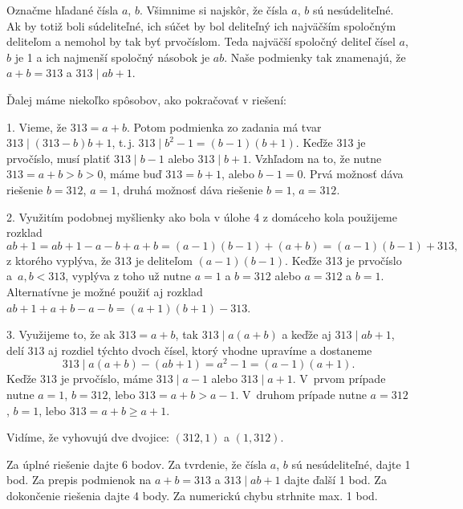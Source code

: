 {%
Označme hľadané čísla $a$, $b$.
Všimnime si najskôr, že čísla $a$, $b$ sú nesúdeliteľné.
Ak by totiž boli súdeliteľné, ich súčet by bol deliteľný ich najväčším spoločným deliteľom a nemohol by tak byť prvočíslom.
Teda najväčší spoločný deliteľ čísel $a$, $b$ je 1 a ich najmenší spoločný násobok je $ab$. Naše podmienky tak znamenajú, že $a+b=313$ a $313\mid ab+1$.

Ďalej máme niekoľko spôsobov, ako pokračovať v riešení:

\smallskip
\item{1.} Vieme, že $313=a+b$.
Potom podmienka zo zadania má tvar $313\mid (313-b)b+1$, t.\,j. $313\mid b^2-1=(b-1)(b+1)$.
Keďže 313 je prvočíslo, musí platiť $313\mid b-1$ alebo $313\mid b+1$.
Vzhľadom na to, že nutne $313=a+b>b>0$, máme buď $313=b+1$, alebo $b-1=0$. Prvá možnosť dáva riešenie $b=312$, $a=1$, druhá možnosť dáva riešenie $b=1$, $a=312$.

\item{2.} Využitím podobnej myšlienky ako bola v úlohe 4 z domáceho kola použijeme rozklad
 $$ab+1 =ab + 1 -a -b +a+b = (a-1)(b-1) +(a+b) =(a-1)(b-1) + 313,$$
 z ktorého vyplýva, že $313$ je deliteľom $(a-1)(b-1)$.
Keďže 313 je prvočíslo a~$a,b<313$, vyplýva z toho už nutne $a=1$ a $b=312$ alebo $a=312$ a $b=1$.
Alternatívne je možné použiť aj rozklad $ab + 1 +a +b -a-b = (a+1)(b+1) -313$.

\item{3.} Využijeme to, že ak $313 = a+b$, tak $313 \mid a(a+b)$ a keďže aj $313\mid ab+1$, delí $313$ aj rozdiel týchto dvoch čísel, ktorý vhodne upravíme a dostaneme
 $$313 \mid a(a+b)-(ab+1)=a^2-1=(a-1)(a+1).$$
 Keďže $313$ je prvočíslo, máme $313 \mid a-1$ alebo $313 \mid a+1$.
 V~prvom prípade nutne $a=1$, $b=312$, lebo $313=a+b>a-1$. V~druhom prípade nutne $a=312$, $b=1$, lebo $313=a+b\ge a+1$.

\smallskip\noindent
Vidíme, že vyhovujú dve dvojice: $(312,1)$ a $(1,312)$.


\schemaABC
Za úplné riešenie dajte 6 bodov. Za tvrdenie, že čísla $a$, $b$ sú nesúdeliteľné, dajte 1 bod. Za prepis podmienok na $a+b=313$ a $313\mid ab+1$ dajte ďalší 1 bod. Za dokončenie riešenia dajte 4 body.
Za numerickú chybu strhnite max. 1 bod.
\endschema
}

